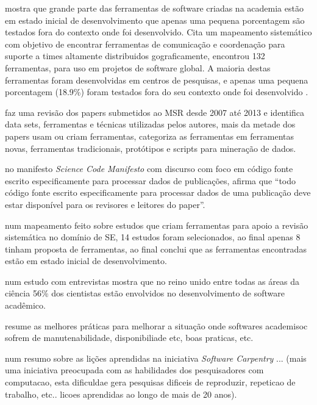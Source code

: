  mostra que grande parte das ferramentas de
software criadas na academia estão em estado inicial de desenvolvimento que
apenas uma pequena porcentagem são testados fora do contexto onde foi
desenvolvido. Cita um mapeamento sistemático com objetivo de encontrar
ferramentas de comunicação e coordenação para suporte a times altamente
distribuidos gograficamente, encontrou 132 ferramentas, para uso em projetos de
software global. A maioria destas ferramentas foram desenvolvidas em centros de
pesquisas, e apenas uma pequena porcentagem (18.9\%) foram testados fora do seu
contexto onde foi desenvolvido \cite{portillo2012tools}.

faz uma revisão dos papers submetidos ao MSR desde 2007 até 2013 e
identifica data sets, ferramentas e técnicas utilizadas pelos autores, mais
da metade dos papers usam ou criam ferramentas, categoriza as ferramentas em
ferramentas novas, ferramentas tradicionais, protótipos e scripts para
mineração de dados.

 no manifesto {\it Science Code Manifesto} com
discurso com foco em código fonte escrito especificamente para processar dados
de publicações, afirma que ``todo código fonte escrito especificamente para
processar dados de uma publicação deve estar disponível para os revisores e
leitores do paper''.

 num mapeamento feito sobre estudos que criam
ferramentas para apoio a revisão sistemática no domínio de SE, 14 estudos foram
selecionados, ao final apenas 8 tinham proposta de ferramentas, ao final
conclui que as ferramentas encontradas estão em estado inicial de
desenvolvimento.

 num estudo com entrevistas mostra que no reino
unido entre todas as áreas da ciência 56\% dos cientistas estão envolvidos no
desenvolvimento de software acadêmico.

 resume as melhores práticas para melhorar a
situação onde softwares academisoc sofrem de manutenabilidade, disponibiliade
etc, boas praticas, etc.

 num resumo sobre as lições aprendidas na iniciativa
{\it Software Carpentry} ...  (mais uma iniciativa preocupada com as
habilidades dos pesquisadores com computacao, esta dificuldae gera pesquisas
dificeis de reproduzir, repeticao de trabalho, etc.. licoes aprendidas ao longo
de mais de 20 anos).

